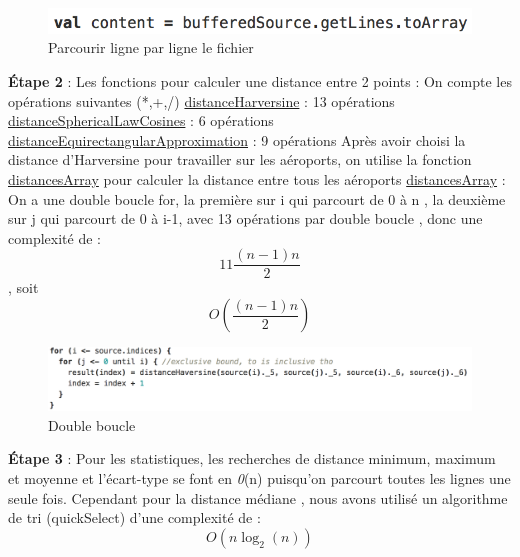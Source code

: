 \documentclass{article}
\begin{document}
        \begin{figure}[H]
        	\centering
        	\includegraphics[scale=0.5]{etape1comp.png}
        	\caption{Parcourir ligne par ligne le fichier}
        	\label{fig:etape1}
        \end{figure}
        	
        \textbf{Étape 2} : Les fonctions pour calculer une distance entre 2 points : On compte les opérations suivantes (*,+,/) \newline
        \underline{distanceHarversine} : 13 opérations \newline
        \underline{distanceSphericalLawCosines} : 6 opérations \newline
        \underline{distanceEquirectangularApproximation} : 9 opérations \newline
        Après avoir choisi la distance d'Harversine pour travailler sur les aéroports, on utilise la fonction \underline{distancesArray} pour calculer la distance entre tous les aéroports \newline
        \underline{distancesArray} : On a une double boucle for, la première sur i qui parcourt de 0 à n , la deuxième sur j qui parcourt de 0 à i-1, avec 13 opérations par double boucle , donc une complexité de : \[ 11\frac{(n-1)n}{2} \],  soit \[O(\frac{(n-1)n}{2})\]  \newline
        
        \begin{figure}[H]
        	\centering
        	\includegraphics[scale=0.5]{etape2comp.png}
        	\caption{Double boucle}
        	\label{fig:etape2}
        \end{figure}
        
        \textbf{Étape 3} : Pour les statistiques, les recherches de distance minimum, maximum et moyenne et l'écart-type se font en \textit{0}(n) puisqu'on parcourt toutes les lignes une seule fois.\newline
        Cependant pour la distance médiane , nous avons utilisé un algorithme de tri (quickSelect) d'une complexité de : \[ O(n\log_2(n)) \] \newline
        
\end{document}
